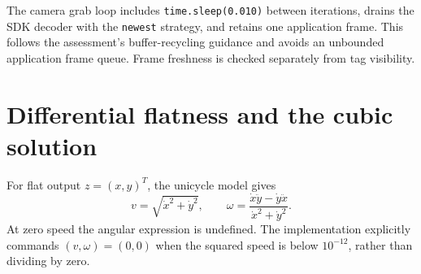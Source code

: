 \documentclass[11pt,a4paper]{article}
\begin{document}
The camera grab loop includes \texttt{time.sleep(0.010)} between iterations, drains the SDK decoder with the \texttt{newest} strategy, and retains one application frame. This follows the assessment's buffer-recycling guidance and avoids an unbounded application frame queue. Frame freshness is checked separately from tag visibility.

\section{Differential flatness and the cubic solution}
For flat output $z=(x,y)^T$, the unicycle model gives
\begin{equation}
 v=\sqrt{\dot{x}^2+\dot{y}^2},\qquad
 \omega=\frac{\dot{x}\ddot{y}-\dot{y}\ddot{x}}{\dot{x}^2+\dot{y}^2}.
\end{equation}
At zero speed the angular expression is undefined. The implementation explicitly commands $(v,\omega)=(0,0)$ when the squared speed is below $10^{-12}$, rather than dividing by zero.
\end{document}
